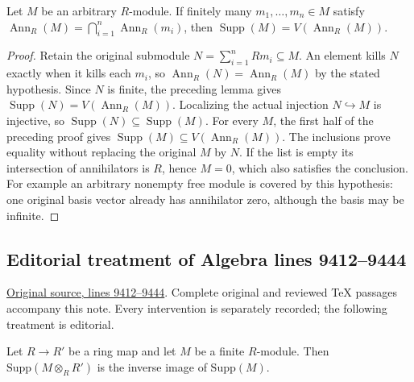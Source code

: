 \begin{lemma}
\label{editorial-source-lemma-support-finite-annihilator-detection}
Let $M$ be an arbitrary $R$-module. If finitely many
$m_1,\ldots,m_n\in M$ satisfy
$\operatorname{Ann}_R(M)=\bigcap_{i=1}^n\operatorname{Ann}_R(m_i)$,
then $\operatorname{Supp}(M)=V(\operatorname{Ann}_R(M))$.
\end{lemma}

\begin{proof}
Retain the original submodule $N=\sum_{i=1}^n Rm_i\subseteq M$.
An element kills $N$ exactly when it kills each $m_i$,
so $\operatorname{Ann}_R(N)=\operatorname{Ann}_R(M)$ by
the stated hypothesis. Since $N$ is finite, the preceding
lemma gives $\operatorname{Supp}(N)=V(\operatorname{Ann}_R(M))$.
Localizing the actual injection $N\hookrightarrow M$
is injective, so $\operatorname{Supp}(N)\subseteq\operatorname{Supp}(M)$.
For every $M$, the first half of the preceding proof
gives $\operatorname{Supp}(M)\subseteq V(\operatorname{Ann}_R(M))$.
The inclusions prove equality without replacing the
original $M$ by $N$. If the list is empty its intersection
of annihilators is $R$, hence $M=0$, which also satisfies
the conclusion. For example an arbitrary nonempty free
module is covered by this hypothesis: one original basis
vector already has annihilator zero, although the basis
may be infinite.
\end{proof}


\subsection{Editorial treatment of Algebra lines 9412--9444}

\hypertarget{algebra-context-101}{}

\noindent\href{https://github.com/stacks/stacks-project/blob/a04446e57ec1fbc252a871afcec7752fb2807b14/algebra.tex\#L9412}{Original source, lines 9412--9444}. Complete original and reviewed TeX passages accompany this note. Every intervention is separately recorded; the following treatment is editorial.


\begin{lemma}
\label{editorial-source-lemma-support-base-change}
Let $R \to R'$ be a ring map and let $M$ be a finite $R$-module.
Then $\text{Supp}(M \otimes_R R')$ is the inverse image of
$\text{Supp}(M)$.
\end{lemma}

